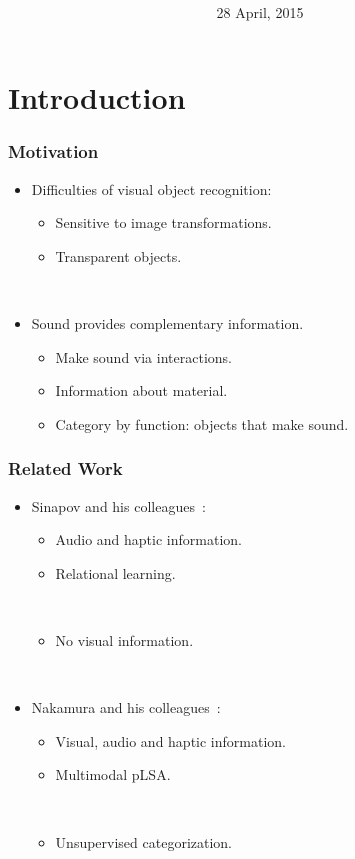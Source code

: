 \documentclass{beamer}
\title{\trtitle \\ \vspace{5pt} \footnotesize \trtype}
\author{\trauthor \\ \vspace{5pt} \footnotesize \trfach}
\date{28 April, 2015}
\begin{document}
\frame{\titlepage}


\section{Introduction}
\begin{frame}
  \frametitle{Motivation}

  \begin{itemize}
    \item Difficulties of visual object recognition:
      \begin{itemize}
        \item Sensitive to image transformations. 
        \item Transparent objects.
      \end{itemize}
      ~

    \item Sound provides complementary information.
      \begin{itemize}
        \item Make sound via interactions.
        \item Information about material. 
        \item Category by function: objects that make sound.
      \end{itemize}
  \end{itemize}
\end{frame}

\begin{frame}
  \frametitle{Related Work}

  \begin{itemize}
    \item Sinapov and his colleagues~\cite{sinapov_interactive_2009,sinapov_object_2011}: 
      \begin{itemize}
        \item Audio and haptic information.
        \item Relational learning.

          ~
        \item No visual information.
      \end{itemize}
      ~

    \item Nakamura and his colleagues~\cite{nakamura_multimodal_2007,nakamura_bag_2012}:
      \begin{itemize}
        \item Visual, audio and haptic information.
        \item Multimodal pLSA.

          ~
        \item Unsupervised categorization.
      \end{itemize}
  \end{itemize}
\end{frame}
\end{document}
